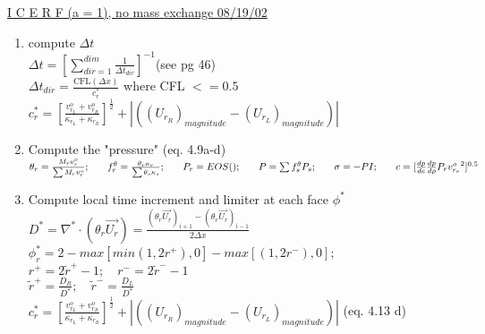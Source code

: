 \documentclass[fleqn]{article}
\newcommand{\delt}          {\ensuremath{\Delta{t}} }
\newcommand{\delx}          {\ensuremath{\Delta{x}} }
\newcommand{\f}             {\ensuremath{f^{\theta}_r} }
\newcommand{\sv}[1]         {\ensuremath{v^o_{r_{#1}} }}
\begin{document}
\setlength{\abovedisplayskip}{0.01in}
\setlength{\abovedisplayshortskip}{0.01in}
\setlength{\belowdisplayskip}{0.01in}
\setlength{\belowdisplayshortskip}{0.01in}
\setlength{\topsep}{0.01in}
\setlength{\mathindent}{0.01in}
\doublespacing

\underline{I C E R F \quad  (a = 1), no mass exchange \hspace{ 0.5in}08/19/02}

\begin{enumerate}


\item compute $\delt$\\
  $ \delt = [ \sum_{dir=1}^{dim}\frac{1}{\delt_{dir}} ]^{-1}  $\hspace{0.5in}(see pg 46)\\
  $ \delt_{dir} = \frac{\text{CFL}(\delx)}{c^*_r} $\hspace {0.5in} where CFL $<= 0.5$\\
  $  c^*_r 
   = [\frac{ \sv{L} + \sv{R} }{\kappa_{r_L} + \kappa_{r_R}}]^{\frac{1}{2}} 
   + |((U_{r_R})_{magnitude} - (U_{r_L})_{magnitude})| $
\item Compute the "pressure"  (eq. 4.9a-d)\\
  $
    \theta_r = \frac{M_r \sv{} }{\sum{M_r \sv{} }}; \hspace{0.25in}
    \f = \frac{\theta_r \kappa_r}{\sum{\theta_s \kappa_s}};\hspace{0.25in}
    P_r = EOS(); \hspace{0.25in}
    P = \sum{f^{\theta}_s P_s}; \hspace{0.25in}
    \sigma = -PI; \hspace{0.25in}
    c = [\frac{dp}{de}\frac{dp}{d\rho} P_r {\sv{r}}^2]^{0.5}
  $
\item Compute local time increment and limiter at each face $\phi^*$\\
   $D^* = \nabla^* \cdot { (\theta_r \vec{U_r} )} = \frac{ (\theta_r\vec{U_r})_{i+1} - (\theta_r\vec{U_r})_{i-1}}{2\delx}$  \\
   $\phi^*_r = 2 - max[min(1,2r^+),0]-max[(1,2r^-),0];$ \\
   $ r^+ = 2 \tilde r^{+} - 1;   \quad r^- = 2 \tilde r^{-} - 1$\\
   $ \tilde r^{+} = \frac{D_R}{D^*}; \quad  \tilde r^{-} = \frac{D_L}{D^*}$\\
   $ c^*_r 
   = [\frac{ \sv{L} + \sv{R} }{\kappa_{r_L} + \kappa_{r_R}}]^{\frac{1}{2}} 
   + |((U_{r_R})_{magnitude} - (U_{r_L})_{magnitude})| $   \hspace{0.5in}(eq. 4.13 d)\\

\end{enumerate}
\end{document}
